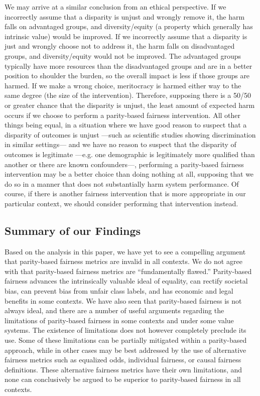 \documentclass[11pt,dvipdfm]{article}
\begin{document}
We may arrive at a similar conclusion from an ethical perspective.  If we incorrectly assume that a disparity is unjust and wrongly remove it, the harm falls on advantaged groups, and diversity/equity (a property which generally has intrinsic value) would be improved.  If we incorrectly assume that a disparity is just and wrongly choose not to address it, the harm falls on disadvantaged groups, and diversity/equity would not be improved.  The advantaged groups  typically have more resources than the disadvantaged groups and are in a better position to shoulder the burden, so the overall impact is less if those groups are harmed.  If we make a wrong choice, meritocracy is harmed either way to the same degree (the size of the intervention).  Therefore, supposing there is a 50/50 or greater chance that the disparity is unjust, the least amount of expected harm occurs if we choose to perform a parity-based fairness intervention.  All other things being equal, in a situation where we have good reason to suspect that a disparity of outcomes is unjust ---such as scientific studies showing discrimination in similar settings--- and we have no reason to suspect that the disparity of outcomes is legitimate ---e.g. one demographic is legitimately more qualified than another or there are known confounders---, performing a parity-based fairness intervention may be a better choice than doing nothing at all, supposing that we do so in a manner that does not substantially harm system performance.  Of course, if there is another fairness intervention that is more appropriate in our particular context, we should consider performing that intervention instead.

\subsection{Summary of our Findings}

Based on the analysis in this paper, we have yet to see a compelling argument that parity-based fairness metrics are invalid in all contexts.  We do not agree with \cite{Hardt2016approaching} that parity-based fairness metrics are ``fundamentally flawed.'' Parity-based fairness advances the intrinsically valuable ideal of equality, can rectify societal bias, can prevent bias from unfair class labels, and has economic and legal benefits in some contexts.  We have also seen that parity-based fairness is not always ideal, and there are a number of useful arguments regarding the limitations of parity-based fairness in some contexts and under some value systems.  The existence of limitations does not however completely preclude its use.  Some of these limitations can be partially mitigated within a parity-based approach, while in other cases may be best addressed by the use of alternative fairness metrics such as equalized odds, individual fairness, or causal fairness definitions.  These alternative fairness metrics have their own limitations, and none can conclusively be argued to be superior to parity-based fairness in all contexts.
\end{document}
